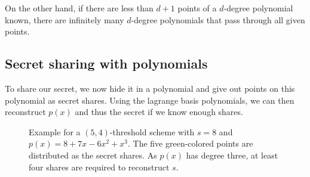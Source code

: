 On the other hand, if there are less than $d+1$ points of a $d$-degree polynomial known, there are infinitely many $d$-degree polynomials that pass through all given points.~\cite{shamir_how_1979}


\subsection{Secret sharing with polynomials}
To share our secret, we now hide it in a polynomial and give out points on this polynomial as secret shares.
Using the lagrange basis polynomials, we can then reconstruct $p(x)$ and thus the secret if we know enough shares.~\cite{shamir_how_1979}

\begin{figure}
    \centering
    \caption[Plot of $(5,4)$-threshold secret sharing scheme]{
        Example for a $(5, 4)$-threshold scheme with $s=8$ and $p(x) = 8 + 7x - 6x^2 + x^3$.
        The five green-colored points are distributed as the secret shares.
        As $p(x)$ has degree three, at least four shares are required to reconstruct $s$.
    }
    \label{fig:sss}
\end{figure}

